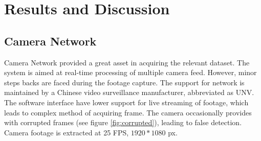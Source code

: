 \chapter{Results and Discussion}

\section{Camera Network}
Camera Network provided a great asset in acquiring the relevant dataset. The system is aimed at real-time processing of multiple camera feed. However, minor steps backs are faced during the footage capture. The support for network is maintained by a Chinese video surveillance manufacturer, abbreviated as UNV. The software interface have lower support for live streaming of footage, which leads to complex method of acquiring frame. The camera occasionally provides with corrupted frames (see figure \ref{fig:corrupted}), leading to false detection. Camera footage is extracted at 25 FPS, $1920*1080$ px.

